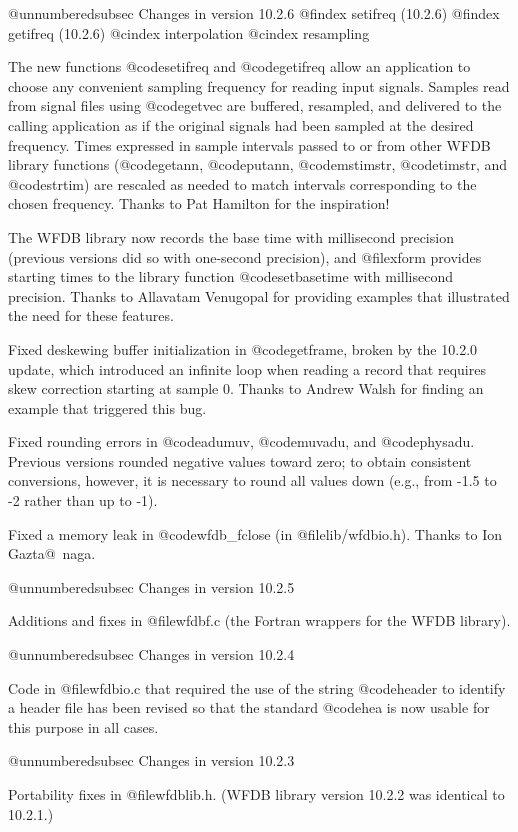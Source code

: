 @unnumberedsubsec Changes in version 10.2.6
@findex setifreq (10.2.6)
@findex getifreq (10.2.6)
@cindex interpolation
@cindex resampling

The new functions @code{setifreq} and @code{getifreq} allow an
application to choose any convenient sampling frequency for reading
input signals.  Samples read from signal files using @code{getvec} are
buffered, resampled, and delivered to the calling application as if the
original signals had been sampled at the desired frequency.  Times
expressed in sample intervals passed to or from other WFDB library
functions (@code{getann}, @code{putann}, @code{mstimstr}, @code{timstr},
and @code{strtim}) are rescaled as needed to match intervals
corresponding to the chosen frequency.  Thanks to Pat Hamilton for the
inspiration!

The WFDB library now records the base time with millisecond precision
(previous versions did so with one-second precision), and @file{xform}
provides starting times to the library function @code{setbasetime} with
millisecond precision.  Thanks to Allavatam Venugopal for providing
examples that illustrated the need for these features.

Fixed deskewing buffer initialization in @code{getframe}, broken by the
10.2.0 update, which introduced an infinite loop when reading a record
that requires skew correction starting at sample 0.  Thanks to Andrew
Walsh for finding an example that triggered this bug.

Fixed rounding errors in @code{adumuv}, @code{muvadu}, and @code{physadu}.
Previous versions rounded negative values toward zero;  to obtain consistent
conversions, however, it is necessary to round all values down (e.g., from
-1.5 to -2 rather than up to -1).

Fixed a memory leak in @code{wfdb_fclose} (in @file{lib/wfdbio.h}).  Thanks to
Ion Gazta@~naga.

@unnumberedsubsec Changes in version 10.2.5

Additions and fixes in @file{wfdbf.c} (the Fortran wrappers for the WFDB
library).

@unnumberedsubsec Changes in version 10.2.4

Code in @file{wfdbio.c} that required the use of the string
@code{header} to identify a header file has been revised so that the
standard @code{hea} is now usable for this purpose in all cases.

@unnumberedsubsec Changes in version 10.2.3

Portability fixes in @file{wfdblib.h}.  (WFDB library version 10.2.2 was
identical to 10.2.1.)

